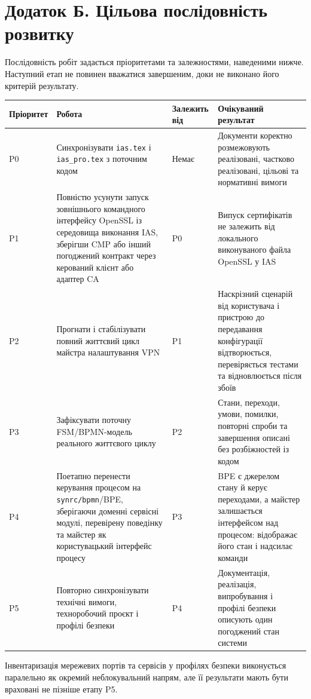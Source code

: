 \documentclass{article}
\begin{document}
\section{Додаток Б. Цільова послідовність розвитку}
Послідовність робіт задається пріоритетами та залежностями, наведеними нижче. Наступний етап не повинен вважатися завершеним, доки не виконано його критерій результату.

\begin{longtable}{p{1.3cm}p{4.4cm}p{3.2cm}p{5.2cm}}
\toprule
\textbf{Пріоритет} & \textbf{Робота} & \textbf{Залежить від} & \textbf{Очікуваний результат} \\
\midrule
P0 & Синхронізувати \texttt{ias.tex} і \texttt{ias\_pro.tex} з поточним кодом & Немає & Документи коректно розмежовують реалізовані, частково реалізовані, цільові та нормативні вимоги \\
P1 & Повністю усунути запуск зовнішнього командного інтерфейсу OpenSSL із середовища виконання IAS, зберігши CMP або інший погоджений контракт через керований клієнт або адаптер CA & P0 & Випуск сертифікатів не залежить від локального виконуваного файла OpenSSL у IAS \\
P2 & Прогнати і стабілізувати повний життєвий цикл майстра налаштування VPN & P1 & Наскрізний сценарій від користувача і пристрою до передавання конфігурації відтворюється, перевіряється тестами та відновлюється після збоїв \\
P3 & Зафіксувати поточну FSM/BPMN-модель реального життєвого циклу & P2 & Стани, переходи, умови, помилки, повторні спроби та завершення описані без розбіжностей із кодом \\
P4 & Поетапно перенести керування процесом на \texttt{synrc/bpmn}/BPE, зберігаючи доменні сервісні модулі, перевірену поведінку та майстер як користувацький інтерфейс процесу & P3 & BPE є джерелом стану й керує переходами, а майстер залишається інтерфейсом над процесом: відображає його стан і надсилає команди \\
P5 & Повторно синхронізувати технічні вимоги, техноробочий проєкт і профілі безпеки & P4 & Документація, реалізація, випробування і профілі безпеки описують один погоджений стан системи \\
\bottomrule
\end{longtable}

Інвентаризація мережевих портів та сервісів у профілях безпеки виконується паралельно як окремий неблокувальний напрям, але її результати мають бути враховані не пізніше етапу P5.
\end{document}
